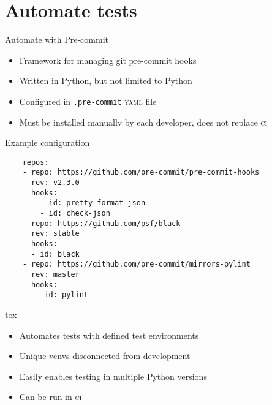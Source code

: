 \section{Automate tests}

\begin{frame}{Automate with Pre-commit}
  \begin{itemize}
    \item Framework for managing git pre-commit hooks
    \item Written in Python, but not limited to Python
    \item Configured in \texttt{.pre-commit} \textsc{yaml} file
    \item Must be installed manually by each developer, does not replace \textsc{ci}
  \end{itemize}
\end{frame}

\begin{frame}[fragile]{Example configuration}
  \begin{verbatim}
    repos:
    - repo: https://github.com/pre-commit/pre-commit-hooks
      rev: v2.3.0
      hooks:
        - id: pretty-format-json
        - id: check-json
    - repo: https://github.com/psf/black
      rev: stable
      hooks:
      - id: black
    - repo: https://github.com/pre-commit/mirrors-pylint
      rev: master
      hooks:
      -  id: pylint
  \end{verbatim}
\end{frame}


\begin{frame}{tox}
  \begin{itemize}
    \item Automates tests with defined test environments
    \item Unique venvs disconnected from development
    \item Easily enables testing in multiple Python versions
    \item Can be run in \textsc{ci}
  \end{itemize}

\end{frame}
